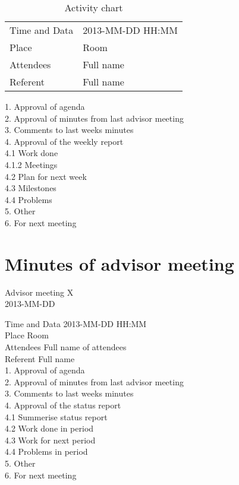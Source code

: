 \begin{table}
\begin{center}
\begin{tabular}{ l | l }
Time and Data & 2013-MM-DD HH:MM \\
Place & Room \\
Attendees & Full name \\
Referent & Full name \\
\end{tabular}
\end{center}
\caption{Activity chart}
\label{table:activityChartAdvisorAgenda}
\end{table}


1. Approval of agenda \\
2. Approval of minutes from last advisor meeting \\
3. Comments to last weeks minutes \\
4. Approval of the weekly report \\
4.1 Work done \\
4.1.2 Meetings \\
4.2 Plan for next week \\
4.3 Milestones \\
4.4 Problems \\
5. Other \\
6. For next meeting \\


\section{Minutes of advisor meeting}

\begin{center}
Advisor meeting X \\
2013-MM-DD \\
\end{center}

Time and Data 	2013-MM-DD HH:MM \\
Place 			Room \\
Attendees  		Full name of attendees \\
Referent 		Full name \\

1. Approval of agenda \\
2. Approval of minutes from last advisor meeting \\
3. Comments to last weeks minutes \\
4. Approval of the status report \\
4.1 Summerise status report \\
4.2 Work done in period \\
4.3 Work for next period \\
4.4 Problems in period \\
5. Other \\
6. For next meeting \\
 

